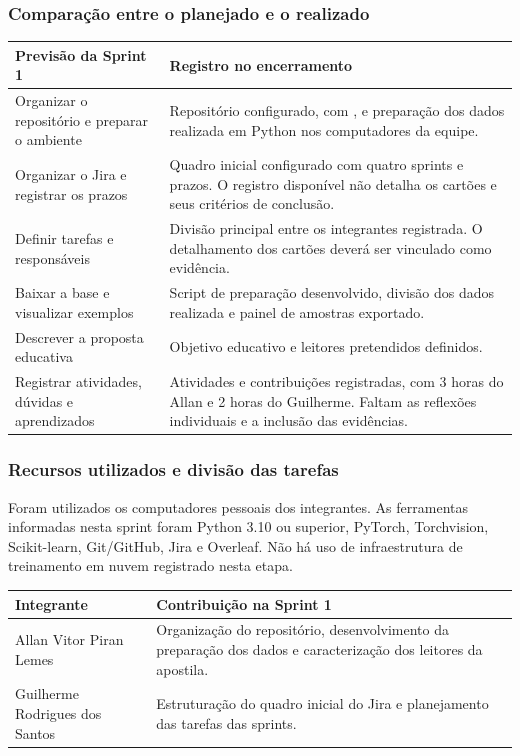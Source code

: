 \documentclass[12pt,a4paper]{article}
\begin{document}
\subsubsection{Comparação entre o planejado e o realizado}
\label{sec:comparacao}
\begin{center}
\small
\begin{tabularx}{\textwidth}{@{}>{\raggedright\arraybackslash}p{}Y@{}}
\toprule
\textbf{Previsão da Sprint 1} & \textbf{Registro no encerramento} \\
\midrule
Organizar o repositório e preparar o ambiente & Repositório configurado, com , e preparação dos dados realizada em Python nos computadores da equipe. \\
Organizar o Jira e registrar os prazos & Quadro inicial configurado com quatro sprints e prazos. O registro disponível não detalha os cartões e seus critérios de conclusão. \\
Definir tarefas e responsáveis & Divisão principal entre os integrantes registrada. O detalhamento dos cartões deverá ser vinculado como evidência. \\
Baixar a base e visualizar exemplos & Script de preparação desenvolvido, divisão dos dados realizada e painel de amostras exportado. \\
Descrever a proposta educativa & Objetivo educativo e leitores pretendidos definidos. \\
Registrar atividades, dúvidas e aprendizados & Atividades e contribuições registradas, com 3 horas do Allan e 2 horas do Guilherme. Faltam as reflexões individuais e a inclusão das evidências. \\
\bottomrule
\end{tabularx}
\end{center}

\subsubsection{Recursos utilizados e divisão das tarefas}
Foram utilizados os computadores pessoais dos integrantes. As ferramentas informadas nesta sprint foram Python 3.10 ou superior, PyTorch, Torchvision, Scikit-learn, Git/GitHub, Jira e Overleaf. Não há uso de infraestrutura de treinamento em nuvem registrado nesta etapa.

\begin{center}
\small
\begin{tabularx}{\textwidth}{@{}>{\raggedright\arraybackslash}p{}Y@{}}
\toprule
\textbf{Integrante} & \textbf{Contribuição na Sprint 1} \\
\midrule
Allan Vitor Piran Lemes & Organização do repositório, desenvolvimento da preparação dos dados e caracterização dos leitores da apostila. \\
Guilherme Rodrigues dos Santos & Estruturação do quadro inicial do Jira e planejamento das tarefas das sprints. \\
\bottomrule
\end{tabularx}
\end{center}
\end{document}
